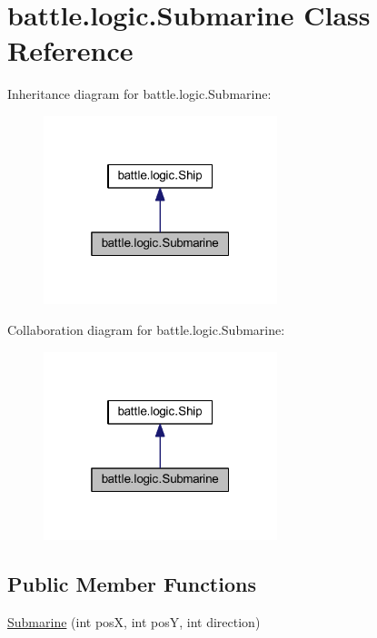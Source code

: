 \hypertarget{classbattle_1_1logic_1_1_submarine}{}\section{battle.\+logic.\+Submarine Class Reference}
\label{classbattle_1_1logic_1_1_submarine}


Inheritance diagram for battle.\+logic.\+Submarine\+:
\nopagebreak
\begin{figure}[H]
\begin{center}
\leavevmode
\includegraphics[width=193pt]{classbattle_1_1logic_1_1_submarine__inherit__graph}
\end{center}
\end{figure}


Collaboration diagram for battle.\+logic.\+Submarine\+:
\nopagebreak
\begin{figure}[H]
\begin{center}
\leavevmode
\includegraphics[width=193pt]{classbattle_1_1logic_1_1_submarine__coll__graph}
\end{center}
\end{figure}
\subsection*{Public Member Functions}
\begin{DoxyCompactItemize}
\item 
\hyperlink{classbattle_1_1logic_1_1_submarine_a600819a5c20d7e8d509139f35e5c6957}{Submarine} (int pos\+X, int pos\+Y, int direction)
\end{DoxyCompactItemize}


